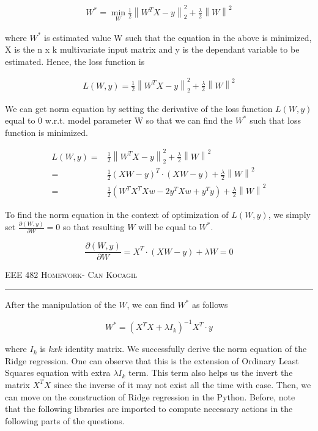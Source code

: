 \documentclass[12pt]{amsart}
\newcommand\norm[1]{\left\lVert#1\right\rVert}
\begin{document}
\begin{align} 
    W^* = \min_{W}  \frac{1}{2}\norm{W^TX - y}_2^2 + \frac{\lambda}{2} \norm{W}^2
\end{align}

where $W^*$ is estimated value W such that the equation in the above is minimized, X is the n x k multivariate input matrix and y is the dependant variable to be estimated. Hence, the loss function is

\begin{align} 
   L(W,y)  = \frac{1}{2}\norm{W^TX - y}_2^2 + \frac{\lambda}{2} \norm{W}^2
\end{align}

We can get norm equation by setting the derivative of the loss function $L(W,y)$ equal to  0 w.r.t. model parameter W so that we can find the $W^*$ such that loss function is minimized.


\begin{align} 
   L(W,y)  = & \frac{1}{2}\norm{W^TX - y}_2^2 + \frac{\lambda}{2} \norm{W}^2 \\
           = & \frac{1}{2}(XW - y)^{T} \cdot (XW - y)  + \frac{\lambda}{2} \norm{W}^2 \\
           = & \frac{1}{2}(W^TX^TXw - 2y^TXw + y^Ty)  + \frac{\lambda}{2} \norm{W}^2
\end{align}

To find the norm equation in the context of optimization of $L(W,y)$, we simply set $\frac{\partial(W,y)}{\partial W} = 0$ so that resulting $W$ will be equal to $W^*$.


\begin{equation}
    \frac{\partial(W,y)}{\partial W} = X^T \cdot (XW-y) + \lambda W = 0
\end{equation} 
    

\newpage
{\scshape EEE 482} \hfill {\scshape \large  Homework-\relax} \hfill {\scshape Can Kocagil}
\smallskip
\hrule
\vspace{2mm}

After the manipulation of the $W$, we can find $W^*$ as follows


\begin{equation}
    W^* = (X^TX + \lambda I_k)^{-1} X^T \cdot y
\end{equation} 

where $I_k$ is $kxk$ identity matrix. We successfully derive the norm equation of the Ridge regression. One can observe that this is the extension of Ordinary Least Squares equation with extra $\lambda I_k$ term. This term also helps us the invert the matrix $X^TX$ since the inverse of it may not exist all the time with ease. Then, we can move on the construction of Ridge regression in the Python. Before, note that the following libraries are imported to compute necessary actions in the following parts of the questions.
\end{document}

